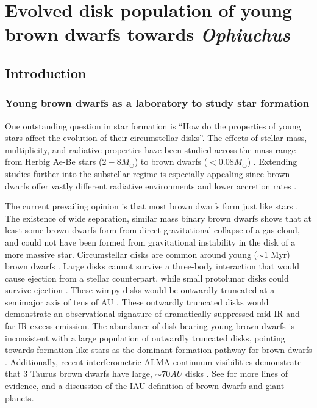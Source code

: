 \chapter{Evolved disk population of young brown dwarfs towards \emph{Ophiuchus}}

\section{Introduction}

\subsection{Young brown dwarfs as a laboratory to study star formation}

One outstanding question in star formation is ``How do the properties of young stars affect the evolution of their circumstellar disks''.  The effects of stellar mass, multiplicity, and radiative properties have been studied across the mass range from Herbig Ae-Be stars ($2-8 M_{\odot}$) to brown dwarfs ($<0.08 M_{\odot}$) \citep{2011ARA&A..49...67W}.  Extending studies further into the substellar regime is especially appealing since brown dwarfs offer vastly different radiative environments and lower accretion rates \citep{2003ApJ...592..266M,2009ApJ...696.1589H}.

The current prevailing opinion is that most brown dwarfs form just like stars \citep{2014prpl.conf..619C}.  The existence of wide separation, similar mass binary brown dwarfs \citep{2004ApJ...614..398L,2006PhDT.........2A,2007ApJ...660.1492C,2009ApJ...691.1265L} shows that at least some brown dwarfs form from direct gravitational collapse of a gas cloud, and could not have been formed from gravitational instability in the disk of a more massive star.  Circumstellar disks are common around young ($\sim 1$ Myr) brown dwarfs \citep{2005ApJ...635L..93L,allers06,2012ARA&A..50...65L,2013A&A...559A.126A}.  Large disks cannot survive a three-body interaction that would cause ejection from a stellar counterpart, while small protolunar disks could survive ejection \citep{2009MNRAS.392..413S}.  These wimpy disks would be outwardly truncated at a semimajor axis of tens of AU \citep{2009MNRAS.392..413S}.  These outwardly truncated disks would demonstrate an observational signature of dramatically suppressed mid-IR and far-IR excess emission.  The abundance of disk-bearing young brown dwarfs is inconsistent with a large population of outwardly truncated disks, pointing towards formation like stars as the dominant formation pathway for brown dwarfs \citep{2012ARA&A..50...65L}.  Additionally, recent interferometric ALMA continuum visibilities demonstrate that 3 Taurus brown dwarfs have large, $\sim70 AU$ disks \citep{2014ApJ...791...20R}.  See \citet{2014prpl.conf..619C} for more lines of evidence, and a discussion of the IAU definition of brown dwarfs and giant planets.

